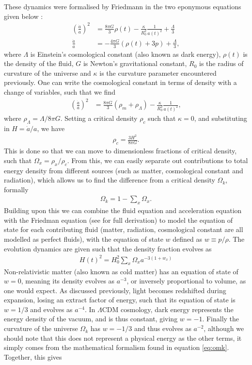 \documentclass[titlesmallcaps, examinerscopy, copyrightpage]{uqthesis}
\begin{document}
These dynamics were formalised by Friedmann in the two eponymous equations given below \citep{RydenPartridge2004}:
\begin{align}
\left(\frac{\dot{a}}{a}\right)^2 &= \frac{8\pi G}{3} \rho(t) - \frac{\kappa}{R_0^2} \frac{1}{a(t)^2} + \frac{\Lambda}{3} \\
\frac{\dot{a}}{a} &= - \frac{4\pi G}{3} (\rho(t) + 3p) + \frac{\Lambda}{3},
\end{align}
where $\Lambda$ is Einstein's cosmological constant (also known as dark energy), $\rho(t)$ is the density of the fluid, $G$ is Newton's gravitational constant, $R_0$ is the radius of curvature of the universe and $\kappa$ is the curvature parameter encountered previously. One can write the cosmological constant in terms of density with a change of variables, such that we find
\begin{align}
\left(\frac{\dot{a}}{a}\right)^2 &= \frac{8\pi G}{3} (\rho_m + \rho_\Lambda) - \frac{\kappa}{R_0^2} \frac{1}{a(t)^2},
\end{align}
where $\rho_\Lambda = \Lambda / 8\pi G$. Setting a critical density $\rho_c$ such that $\kappa = 0$, and substituting in $H = \dot{a}/a$, we have 
\begin{align}
\rho_c = \frac{3H^2}{8\pi G}.
\end{align}
This is done so that we can move to dimensionless fractions of critical density, such that $\Omega_x = \rho_x / \rho_c$. From this, we can easily separate out contributions to total energy density from different sources (such as matter, cosmological constant and radiation), which allows us to find the difference from a critical density $\Omega_k$, formally
\begin{align} \label{eq:omk}
\Omega_k = 1 - \sum_x \Omega_x.
\end{align}
Building upon this we can combine the fluid equation and acceleration equation with the Friedman equation (see \citet[Ch 4.2, 4.3]{RydenPartridge2004} for full derivation) to model the equation of state for each contributing fluid (matter, radiation, cosmological constant are all modelled as perfect fluids), with the equation of state $w$ defined as $w \equiv p/\rho$. The evolution dynamics are given such that the density fraction evolves as
\begin{align} \label{eq:hz}
H(t)^2 = H_0^2 \sum_x \Omega_x a^{-3(1+w_x)}
\end{align}
Non-relativistic matter (also known as cold matter) has an equation of state of $w = 0$, meaning its density evolves as $a^{-3}$, or inversely proportional to volume, as one would expect. As discussed previously, light becomes redshifted during expansion, losing an extract factor of energy, such that its equation of state is $w = 1/3$ and evolves as $a^{-4}$. In $\Lambda$CDM cosmology, dark energy represents the energy density of the vacuum, and is thus constant, giving $w = -1$. Finally the curvature of the universe $\Omega_k$ has $w=-1/3$ and thus evolves as $a^{-2}$, although we should note that this does not represent a physical energy as the other terms, it simply comes from the mathematical formalism found in equation \eqref{eq:omk}. Together, this gives
\end{document}
